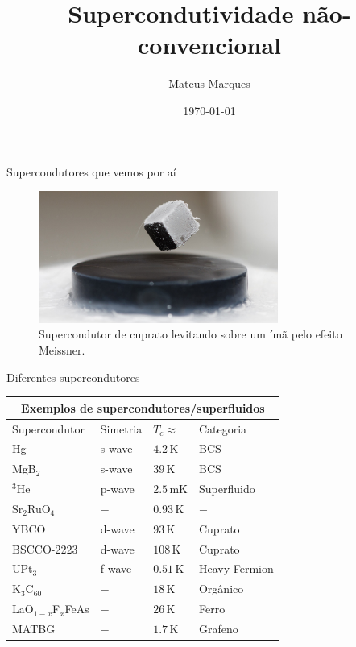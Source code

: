 \documentclass[8pt,aspectratio=169,xcolor={table,dvipsnames,usenames}]{beamer}
\title[Supercondutividade não-convencional]{\LARGE{Supercondutividade não-convencional}}
\author[Mateus Marques]{
\large{Mateus Marques
}}
\date{\today}
\begin{document}
\begin{frame}
  \titlepage
\end{frame}

\begin{frame}{Supercondutores que vemos por aí}

\begin{figure}[H]
\centering
\includegraphics[width=0.7\textwidth]{fig/levitating.jpg}
\caption{Supercondutor de cuprato levitando sobre um ímã pelo efeito Meissner.}
\label{fig:levitating}
\end{figure}

\end{frame}


\begin{frame}{Diferentes supercondutores}

\begin{center}
\begin{tabular}{ |p{3cm}||p{3cm}|p{3cm}|p{3cm}|  }
\hline
\multicolumn{4}{|c|}{Exemplos de supercondutores/superfluidos} \\
\hline
Supercondutor & Simetria & $T_c \approx$ & Categoria \\
\hline
Hg                   & s-wave   & $4.2   \, \text{K}$      & BCS \\
MgB$_2$              & s-wave   & $39    \, \text{K}$      & BCS \\
$^3$He               & p-wave   & $2.5   \, \text{mK}$     & Superfluido \\
Sr$_2$RuO$_4$        & $-$      & $0.93  \, \text{K}$      & $-$ \\
YBCO                 & d-wave   & $93  \, \text{K}$        & Cuprato \\
BSCCO-2223           & d-wave   & $108   \, \text{K}$      & Cuprato \\
UPt$_3$              & f-wave   & $0.51  \, \text{K}$      & Heavy-Fermion \\
K$_3$C$_{60}$        & $-$      & $18    \, \text{K}$      & Orgânico  \\
LaO$_{1-x}$F$_x$FeAs & $-$      & $26    \, \text{K}$      & Ferro  \\
MATBG                & $-$      & $1.7    \, \text{K}$     & Grafeno  \\
\hline
\end{tabular}
\end{center}

\end{frame}
\end{document}
